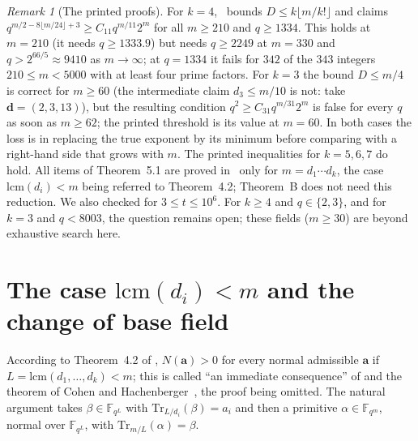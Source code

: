 \documentclass[11pt,a4paper]{amsart}
\theoremstyle{remark}
\newtheorem{remark}[theorem]{Remark}
\newcommand{\F}{\mathbb{F}}
\newcommand{\Tr}{\mathrm{Tr}}
\newcommand{\lcm}{\mathrm{lcm}}
\newcommand{\bd}{\mathbf{d}}
\newcommand{\ba}{\mathbf{a}}
\newcommand{\MKB}{\cite{MKB}}
\begin{document}
\begin{remark}[The printed proofs]\label{rem:proofs}
For $k=4$, \MKB\ bounds $D\le k\lfloor m/k!\rfloor$ and claims
$q^{m/2-8\lfloor m/24\rfloor+3}\ge C_{11}q^{m/11}2^{m}$ for all $m\ge210$ and $q\ge1334$. This holds at
$m=210$ (it needs $q\ge1333.9$) but needs $q\ge2249$ at $m=330$ and $q>2^{66/5}\approx9410$ as $m\to\infty$;
at $q=1334$ it fails for $342$ of the $343$ integers $210\le m<5000$ with at least four prime factors. For
$k=3$ the bound $D\le m/4$ is correct for $m\ge60$ (the intermediate claim $d_3\le m/10$ is not: take
$\bd=(2,3,13)$), but the resulting condition $q^{2}\ge C_{31}q^{m/31}2^{m}$ is false for every $q$ as soon as
$m\ge62$; the printed threshold is its value at $m=60$. In both cases the loss is in replacing the true
exponent by its minimum before comparing with a right-hand side that grows with $m$. The printed
inequalities for $k=5,6,7$ do hold. All items of Theorem~5.1 are proved in \MKB\ only for
$m=d_1\cdots d_k$, the case $\lcm(d_i)<m$ being referred to Theorem~4.2; Theorem~B does not need this
reduction. We also checked \cite[Lemma~2.9]{MKB} for $3\le t\le10^{6}$. For $k\ge4$ and $q\in\{2,3\}$, and for
$k=3$ and $q<8003$, the question remains open; these fields ($m\ge30$) are beyond exhaustive search here.
\end{remark}

\section{\texorpdfstring{The case $\lcm(d_i)<m$ and the change of base field}{The case lcm(d\_i) < m and the change of base field}}

According to Theorem~4.2 of \MKB, $N(\ba)>0$ for every normal admissible $\ba$ if $L=\lcm(d_1,\dots,d_k)<m$; this is
called ``an immediate consequence'' of \cite{Reis} and the theorem of Cohen and Hachenberger~\cite{CH}, the proof
being omitted. The natural argument takes $\beta\in\F_{q^{L}}$ with $\Tr_{L/d_i}(\beta)=a_i$ and then a
primitive $\alpha\in\F_{q^m}$, normal over $\F_{q^{L}}$, with $\Tr_{m/L}(\alpha)=\beta$.
\end{document}
